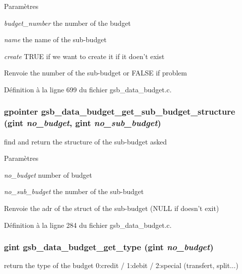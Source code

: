 \begin{DoxyParams}{Paramètres}
\item[{\em budget\_\-number}]the number of the budget \item[{\em name}]the name of the sub-\/budget \item[{\em create}]TRUE if we want to create it if it doen't exist\end{DoxyParams}
\begin{DoxyReturn}{Renvoie}
the number of the sub-\/budget or FALSE if problem 
\end{DoxyReturn}


Définition à la ligne 699 du fichier gsb\_\-data\_\-budget.c.

\subsubsection[{gsb\_\-data\_\-budget\_\-get\_\-sub\_\-budget\_\-structure}]{\setlength{\rightskip}{0pt plus 5cm}gpointer gsb\_\-data\_\-budget\_\-get\_\-sub\_\-budget\_\-structure (gint {\em no\_\-budget}, \/  gint {\em no\_\-sub\_\-budget})}\label{gsb__data__budget_8h_a6f2e832890d1351f46fa91d33e4d55d4}
find and return the structure of the sub-\/budget asked


\begin{DoxyParams}{Paramètres}
\item[{\em no\_\-budget}]number of budget \item[{\em no\_\-sub\_\-budget}]the number of the sub-\/budget\end{DoxyParams}
\begin{DoxyReturn}{Renvoie}
the adr of the struct of the sub-\/budget (NULL if doesn't exit) 
\end{DoxyReturn}


Définition à la ligne 284 du fichier gsb\_\-data\_\-budget.c.

\subsubsection[{gsb\_\-data\_\-budget\_\-get\_\-type}]{\setlength{\rightskip}{0pt plus 5cm}gint gsb\_\-data\_\-budget\_\-get\_\-type (gint {\em no\_\-budget})}\label{gsb__data__budget_8h_a11b94ff79cd2f1c623fd8e83463a2321}
return the type of the budget 0:credit / 1:debit / 2:special (transfert, split...)


